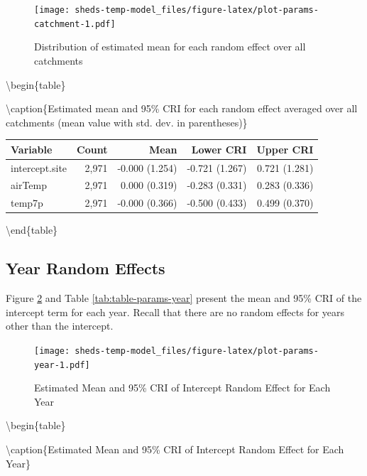 \documentclass[
]{book}
\begin{document}
\begin{figure}
\centering
\texttt{[image: sheds-temp-model\_files/figure-latex/plot-params-catchment-1.pdf]}
\caption{\label{fig:plot-params-catchment}Distribution of estimated mean for each random effect over all catchments}
\end{figure}

\textbackslash begin\{table\}

\textbackslash caption\{\label{tab:table-params-catchment}Estimated mean and 95\% CRI for each random effect averaged over all catchments (mean value with std. dev. in parentheses)\}
\centering

\begin{tabular}[t]{l|r|r|r|r}
\hline
Variable & Count & Mean & Lower CRI & Upper CRI\\
\hline
intercept.site & 2,971 & -0.000 (1.254) & -0.721 (1.267) & 0.721 (1.281)\\
\hline
airTemp & 2,971 & 0.000 (0.319) & -0.283 (0.331) & 0.283 (0.336)\\
\hline
temp7p & 2,971 & -0.000 (0.366) & -0.500 (0.433) & 0.499 (0.370)\\
\hline
\end{tabular}

\textbackslash end\{table\}

\subsection{Year Random Effects}\label{year-random-effects-1}

Figure \ref{fig:plot-params-year} and Table \ref{tab:table-params-year} present the mean and 95\% CRI of the intercept term for each year. Recall that there are no random effects for years other than the intercept.

\begin{figure}
\centering
\texttt{[image: sheds-temp-model\_files/figure-latex/plot-params-year-1.pdf]}
\caption{\label{fig:plot-params-year}Estimated Mean and 95\% CRI of Intercept Random Effect for Each Year}
\end{figure}

\textbackslash begin\{table\}

\textbackslash caption\{\label{tab:table-params-year}Estimated Mean and 95\% CRI of Intercept Random Effect for Each Year\}
\centering
\end{document}
